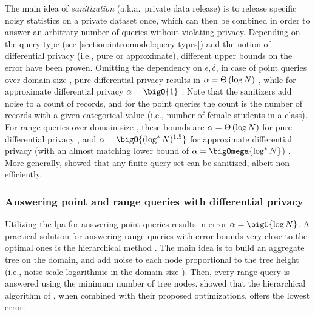 			The main idea of \emph{sanitization} (a.k.a.\ private data release) is to release specific noisy statistics on a private dataset once, which can then be combined in order to answer an arbitrary number of queries without violating privacy.
			Depending on the query type (see \cref{section:intro:model:query-types}) and the notion of differential privacy (i.e., pure or approximate), different upper bounds on the error have been proven.
			Omitting the dependency on $\epsilon, \delta$, in case of point queries over domain size \domainSize{}, pure differential privacy results in $\alpha = \Theta \left( \log N \right)$ \cite{bounds-on-sample-complexity}, while for approximate differential privacy $\alpha = \bigO{1}$ \cite{private-learning-and-sanitization}.
			Note that the sanitizers add noise to a count of records, and for the point queries the count is the number of records with a given categorical value (i.e., number of female students in a class).
			For range queries over domain size \domainSize{}, these bounds are $\alpha = \Theta \left( \log N \right)$ for pure differential privacy \cite{non-interactive-database-privacy,dp-under-observation}, and $\alpha = \bigO{(\log^{*} \domainSize)^{1.5}}$ for approximate differential privacy (with an almost matching lower bound of $\alpha = \bigOmega{\log^{*} \domainSize}$) \cite{private-learning-and-sanitization, dp-release, privately-learning-thresholds}.
			More generally, \textcite{non-interactive-database-privacy} showed that any finite query set \querySet{} can be sanitized, albeit non-efficiently.

			\subsubsection{Answering point and range queries with differential privacy}

				Utilizing the \acrshort{lpa} for answering point queries results in error $\alpha = \bigO{\log \domainSize}$.
				A practical solution for answering range queries with error bounds very close to the optimal ones is the hierarchical method \cite{dp-under-observation, accuracy-dp-histograms, dp-wavelet}.
				The main idea is to build an aggregate tree on the domain, and add noise to each node proportional to the tree height (i.e., noise scale logarithmic in the domain size \domainSize{}).
				Then, every range query is answered using the minimum number of tree nodes.
				\textcite{hierarchical-methods-for-dp} showed that the hierarchical algorithm of \textcite{accuracy-dp-histograms}, when combined with their proposed optimizations, offers the lowest error.

